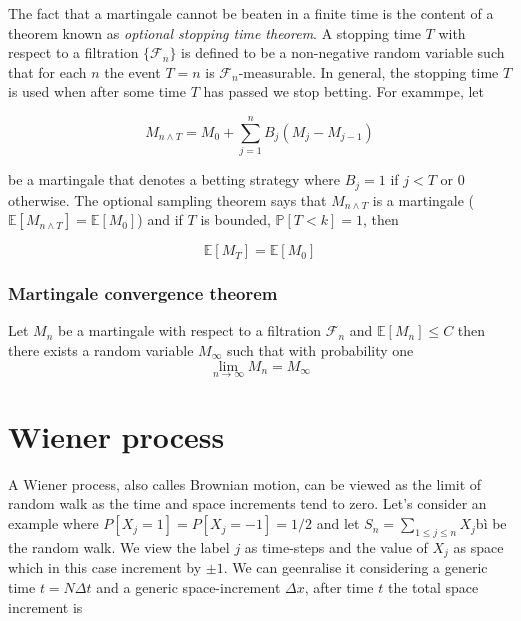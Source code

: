 \documentclass[11pt,a4paper]{article}
\begin{document}
The fact that a martingale cannot be beaten in a finite time is the content of a theorem known as \textit{optional stopping time theorem}. A stopping time $T$ with respect to a filtration $\{\mathcal{F}_n\}$ is defined to be a non-negative random variable such that for each $n$ the event $T=n$ is $\mathcal{F}_n$-measurable. 
In general, the stopping time $T$ is used when after some time $T$ has passed we stop betting.
For exammpe, let

\begin{equation}
M_{n \wedge T} = M_0 + \sum_{j=1}^{n}B_j(M_j-M_{j-1})
\end{equation}

be a martingale that denotes a betting strategy where $B_j=1$ if $j<T$ or $0$ otherwise. The optional sampling theorem says that $M_{n \wedge T}$ is a martingale ($\mathbb{E}[M_{n \wedge T}]  =   \mathbb{E}[M_0]$) and if  $T$ is bounded, $\mathbb{P}[T<k] = 1$, then 

\begin{equation}
\mathbb{E}[M_T]  =   \mathbb{E}[M_0]
\end{equation}

\subsubsection{Martingale convergence theorem}

Let $M_n$ be a martingale with respect to a filtration $\mathcal{F}_n$ and $\mathbb{E}[M_n] \leq C$ then there exists a random variable $M_{\infty}$ such that with probability one 
\begin{equation}
    \lim_{n \to \infty}M_n = M_{\infty}
\end{equation}




\section{Wiener process}
A Wiener process, also calles Brownian motion, can be viewed as the limit of random walk as the time and space increments tend to zero. Let's consider an example where $P[X_j = 1] =  P[X_j = -1] = 1/2$ and let $S_n = \sum_{1 \leq j \leq n} X_j $bì be the random walk. We view the label $j$ as time-steps and the value of $X_j$ as space which in this case increment by $\pm 1$. We can geenralise it considering a generic time $t = N \Delta t$ and a generic space-increment $\Delta x$, after time $t$ the total space increment is
\end{document}

